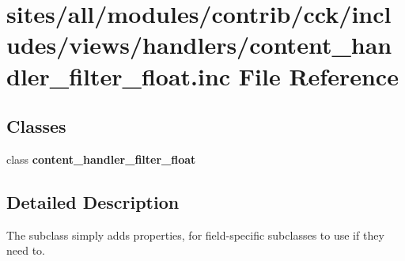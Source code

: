 \hypertarget{content__handler__filter__float_8inc}{
\section{sites/all/modules/contrib/cck/includes/views/handlers/content\_\-handler\_\-filter\_\-float.inc File Reference}
\label{content__handler__filter__float_8inc}
}
\subsection*{Classes}
\begin{CompactItemize}
\item 
class \textbf{content\_\-handler\_\-filter\_\-float}
\end{CompactItemize}


\subsection{Detailed Description}
The subclass simply adds properties, for field-specific subclasses to use if they need to. 